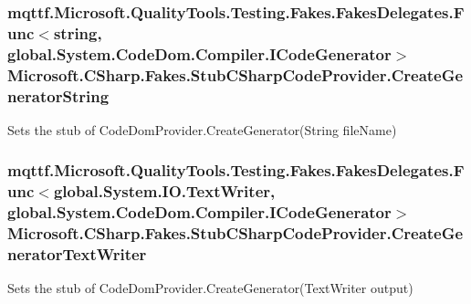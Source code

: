 \hypertarget{class_microsoft_1_1_c_sharp_1_1_fakes_1_1_stub_c_sharp_code_provider_ae50b22c3ca2821d28f1e7e644071ebde}{
\subsubsection[{Create\-Generator\-String}]{\setlength{\rightskip}{0pt plus 5cm}mqttf.\-Microsoft.\-Quality\-Tools.\-Testing.\-Fakes.\-Fakes\-Delegates.\-Func$<$string, global.\-System.\-Code\-Dom.\-Compiler.\-I\-Code\-Generator$>$ Microsoft.\-C\-Sharp.\-Fakes.\-Stub\-C\-Sharp\-Code\-Provider.\-Create\-Generator\-String}}\label{class_microsoft_1_1_c_sharp_1_1_fakes_1_1_stub_c_sharp_code_provider_ae50b22c3ca2821d28f1e7e644071ebde}


Sets the stub of Code\-Dom\-Provider.\-Create\-Generator(\-String file\-Name)

\hypertarget{class_microsoft_1_1_c_sharp_1_1_fakes_1_1_stub_c_sharp_code_provider_a3b379b03bad311e0cb9491c61d560622}{
\subsubsection[{Create\-Generator\-Text\-Writer}]{\setlength{\rightskip}{0pt plus 5cm}mqttf.\-Microsoft.\-Quality\-Tools.\-Testing.\-Fakes.\-Fakes\-Delegates.\-Func$<$global.\-System.\-I\-O.\-Text\-Writer, global.\-System.\-Code\-Dom.\-Compiler.\-I\-Code\-Generator$>$ Microsoft.\-C\-Sharp.\-Fakes.\-Stub\-C\-Sharp\-Code\-Provider.\-Create\-Generator\-Text\-Writer}}\label{class_microsoft_1_1_c_sharp_1_1_fakes_1_1_stub_c_sharp_code_provider_a3b379b03bad311e0cb9491c61d560622}


Sets the stub of Code\-Dom\-Provider.\-Create\-Generator(\-Text\-Writer output)


